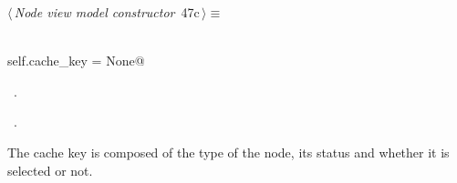 \documentclass[
    a4paper,      %
    10pt,         %
    openright,    %
    notitlepage,  %
    parskip=half, %
]{scrreprt}       %
\theoremstyle{definition}                    %
\begin{document}
\begin{flushleft} \small
\begin{minipage}{\linewidth}\label{scrap65}\raggedright\small
{} $\langle\,${\itshape Node view model constructor}\nobreak\ {\footnotesize {47c}}$\,\rangle\equiv$
\vspace{-1exm}
\begin{list}{}{} \item
\mbox{}\lstinline@@\\
\mbox{}\lstinline@    self.cache_key = None@\\
\mbox{}\lstinline@@{\NWsep}
\end{list}
\vspace{-1.5ex}
\footnotesize
\begin{list}{}{\setlength{\itemsep}{-\parsep}\setlength{\itemindent}{-\leftmargin}}
\item \NWtxtMacroDefBy\ .
\item \NWtxtMacroRefIn\ .

\item{}
\end{list}
\end{minipage}\vspace{4ex}
\end{flushleft}
The cache key is composed of the type of the node, its status and whether it is
selected or not.
\end{document}
